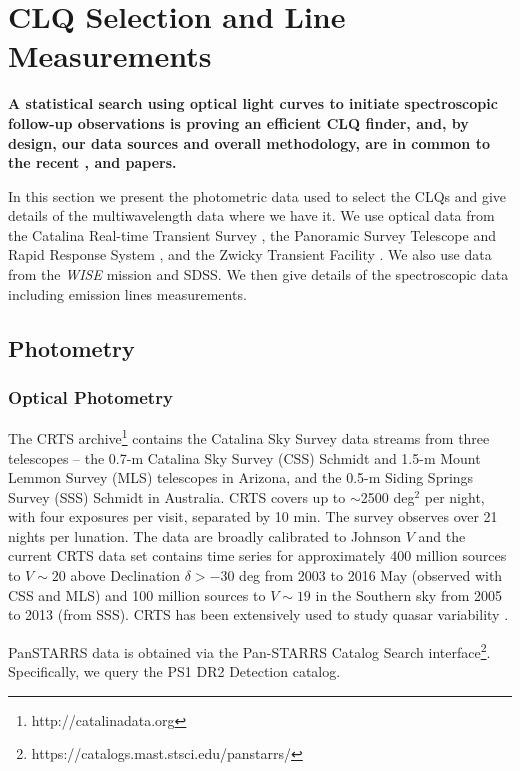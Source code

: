 \documentclass[fleqn,usenatbib]{mnras}
\begin{document}
\section{CLQ Selection and Line Measurements}
{\bf A statistical search using optical light curves to initiate
spectroscopic follow-up observations is proving an efficient CLQ
finder, and, by design, our data sources and overall methodology, are
in common to the recent \citet{Ross2018}, \citet{Stern2018} and
\citet{Graham2020} papers.}

In this section we present the photometric data used to select the
CLQs and give details of the multiwavelength data where we have it.
We use optical data from the Catalina Real-time Transient Survey
\citep[CRTS;][]{Drake2009, Mahabal2011}, the Panoramic Survey
Telescope and Rapid Response System \citep[PanSTARRS;][]{Kaiser2010,
Stubbs2010, Tonry2012, Magnier2013}, and the Zwicky Transient Facility
\citep[ZTF;][]{Bellm2019_ZTFOverview}. 
We also use data from the {\it WISE} mission and SDSS. 
We then give details of the spectroscopic data including emission
lines measurements.

\subsection{Photometry}
\subsubsection{Optical Photometry}
The CRTS archive\footnote{http://catalinadata.org} contains the
Catalina Sky Survey data streams from three telescopes -- the 0.7-m
Catalina Sky Survey (CSS) Schmidt and 1.5-m Mount Lemmon Survey (MLS)
telescopes in Arizona, and the 0.5-m Siding Springs Survey (SSS)
Schmidt in Australia. CRTS covers up to $\sim$2500 deg$^2$ per night,
with four exposures per visit, separated by 10 min. The survey
observes over 21 nights per lunation. The data are broadly calibrated
to Johnson $V$ \citep[for details, see][]{Drake2013} and the current
CRTS data set contains time series for approximately 400 million
sources to $V \sim 20$ above Declination $\delta > -30$ deg from 2003
to 2016 May (observed with CSS and MLS) and 100 million sources to $V
\sim 19$ in the Southern sky from 2005 to 2013 (from SSS). CRTS has
been extensively used to study quasar variability
\citep[e.g.,][]{Graham2014, Graham2015, Graham2015Nature, Graham2017,
Graham2020, Stern2017, Stern2018, Ross2018}.

PanSTARRS data is obtained via the Pan-STARRS Catalog Search
interface\footnote{https://catalogs.mast.stsci.edu/panstarrs/}.
Specifically, we query the PS1 DR2 Detection catalog.
\end{document}
